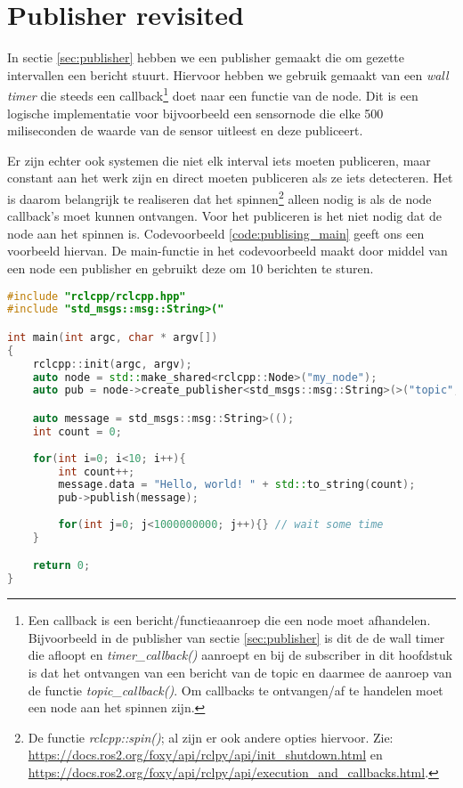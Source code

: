 \section{Publisher revisited}
In sectie \ref{sec:publisher} hebben we een publisher gemaakt die om gezette intervallen een bericht stuurt. Hiervoor hebben we gebruik gemaakt van een \textit{wall timer} die steeds een callback\footnote{Een callback is een bericht/functieaanroep die een node moet afhandelen. Bijvoorbeeld in de publisher van sectie \ref{sec:publisher} is dit de de wall timer die afloopt en \textit{timer\_callback()} aanroept en bij de subscriber in dit hoofdstuk is dat het ontvangen van een bericht van de topic en daarmee de aanroep van de functie \textit{topic\_callback()}. Om callbacks te ontvangen/af te handelen moet een node aan het spinnen zijn.} doet naar een functie van de node. Dit is een logische implementatie voor bijvoorbeeld een sensornode die elke 500 miliseconden de waarde van de sensor uitleest en deze publiceert.

Er zijn echter ook systemen die niet elk interval iets moeten publiceren, maar constant aan het werk zijn en direct moeten publiceren als ze iets detecteren. Het is daarom belangrijk te realiseren dat het spinnen\footnote{De functie \textit{rclcpp::spin()}; al zijn er ook andere opties hiervoor. Zie: \url{https://docs.ros2.org/foxy/api/rclpy/api/init_shutdown.html} en \url{https://docs.ros2.org/foxy/api/rclpy/api/execution_and_callbacks.html}.} alleen nodig is als de node callback's moet kunnen ontvangen. Voor het publiceren is het niet nodig dat de node aan het spinnen is. Codevoorbeeld \ref{code:publising_main} geeft ons een voorbeeld hiervan. De main-functie in het codevoorbeeld maakt door middel van een node een publisher en gebruikt deze om 10 berichten te sturen.

\begin{lstlisting}[language=C++, caption={publishingMain.cpp; zonder node-subclass en zonder \textit{rclcpp::spin()}}, firstnumber=0, label={code:publising_main}]
#include "rclcpp/rclcpp.hpp"
#include "std_msgs::msg::String>("

int main(int argc, char * argv[])
{
    rclcpp::init(argc, argv);
    auto node = std::make_shared<rclcpp::Node>("my_node");
    auto pub = node->create_publisher<std_msgs::msg::String>(>("topic", 10);

    auto message = std_msgs::msg::String>(();
    int count = 0;
    
    for(int i=0; i<10; i++){
        int count++;
        message.data = "Hello, world! " + std::to_string(count);
        pub->publish(message);
        
        for(int j=0; j<1000000000; j++){} // wait some time
    }

    return 0;
}
\end{lstlisting}

